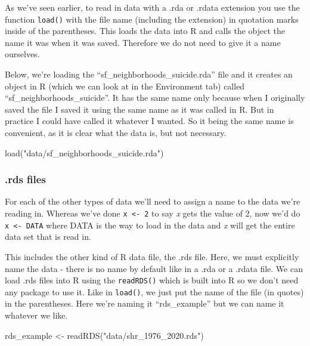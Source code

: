 \documentclass[
]{krantz}
\makeatletter
\newenvironment{Shaded}{\begin{snugshade}}{\end{snugshade}}
\newcommand{\FunctionTok}[1]{\textcolor[rgb]{0,0,0}{#1}}
\newcommand{\NormalTok}[1]{#1}
\newcommand{\OtherTok}[1]{\textcolor[rgb]{0.37,0.37,0.37}{#1}}
\newcommand{\StringTok}[1]{\textcolor[rgb]{0.5,0.5,0.5}{#1}}
\newenvironment{kframe}{%
\medskip{}
\setlength{\fboxsep}{.8em}
 \def\at@end@of@kframe{}%
 \ifinner\ifhmode%
  \def\at@end@of@kframe{\end{minipage}}%
  \begin{minipage}{\columnwidth}%
 \fi\fi%
 \def\FrameCommand##1{\hskip\@totalleftmargin \hskip-\fboxsep
 \colorbox{shadecolor}{##1}\hskip-\fboxsep
     \hskip-\linewidth \hskip-\@totalleftmargin \hskip\columnwidth}%
 \MakeFramed {\advance\hsize-\width
   \@totalleftmargin\z@ \linewidth\hsize
   \@setminipage}}%
 {\par\unskip\endMakeFramed%
 \at@end@of@kframe}
\renewenvironment{Shaded}{\begin{kframe}}{\end{kframe}}
\makeatother
\begin{document}
As we've seen earlier, to read in data with a .rda or .rdata extension you use the function \texttt{load()} with the file name (including the extension) in quotation marks inside of the parentheses. This loads the data into R and calls the object the name it was when it was saved. Therefore we do not need to give it a name ourselves.

Below, we're loading the ``sf\_neighborhoods\_suicide.rda'' file and it creates an object in R (which we can look at in the Environment tab) called ``sf\_neighborhoods\_suicide''. It has the same name only because when I originally saved the file I saved it using the same name as it was called in R. But in practice I could have called it whatever I wanted. So it being the same name is convenient, as it is clear what the data is, but not necessary.

\begin{Shaded}
\begin{Highlighting}[]
\FunctionTok{load}\NormalTok{(}\StringTok{"data/sf\_neighborhoods\_suicide.rda"}\NormalTok{)}
\end{Highlighting}
\end{Shaded}

\hypertarget{rds-files}{%
\subsubsection{.rds files}\label{rds-files}}

For each of the other types of data we'll need to assign a name to the data we're reading in. Whereas we've done \texttt{x\ \textless{}-\ 2} to say \emph{x} gets the value of 2, now we'd do \texttt{x\ \textless{}-\ DATA} where DATA is the way to load in the data and \emph{x} will get the entire data set that is read in.

This includes the other kind of R data file, the .rds file. Here, we must explicitly name the data - there is no name by default like in a .rda or a .rdata file. We can load .rds files into R using the \texttt{readRDS()} which is built into R so we don't need any package to use it. Like in \texttt{load()}, we just put the name of the file (in quotes) in the parentheses. Here we're naming it ``rds\_example'' but we can name it whatever we like.

\begin{Shaded}
\begin{Highlighting}[]
\NormalTok{rds\_example }\OtherTok{\textless{}{-}} \FunctionTok{readRDS}\NormalTok{(}\StringTok{"data/shr\_1976\_2020.rds"}\NormalTok{) }
\end{Highlighting}
\end{Shaded}
\end{document}
